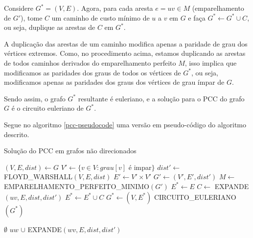 \documentclass[12pt, a4paper]{article}
\begin{document}
Considere $G^* = (V, E)$. Agora, para cada aresta $e = uv \in M$ (emparelhamento de $G'$), tome $C$ um caminho de custo mínimo de $u$ a $v$ em $G$ e faça $G^* \leftarrow G^* \cup C$, ou seja, duplique as arestas de $C$ em $G^*$.

A duplicação das arestas de um caminho modifica apenas a paridade de grau dos vértices extremos.
Como, no procedimento acima, estamos duplicando as arestas de todos caminhos derivados do emparelhamento perfeito $M$, isso implica que modificamos as paridades dos graus de todos os vértices de $G^*$, ou seja, modificamos apenas as paridades dos graus dos vértices de grau ímpar de $G$.

Sendo assim, o grafo $G^*$ resultante é euleriano, e a solução para o PCC do grafo $G$ é o circuito euleriano de $G^*$.


Segue no algoritmo \ref{pcc-pseudocode} uma versão em pseudo-código do algoritmo descrito.





    \begin{algorithm}
    \caption{Solução do PCC em grafos não direcionados}
    \label{pcc-pseudocode}
    \begin{algorithmic}[1]
    \State $(V, E, dist) \gets G$
    \State $V' \gets \{v \in V : grau[v] $ é impar$\}$
    \State $dist' \gets $ FLOYD\_WARSHALL$(V, E, dist)$
    \State $E' \gets V' \times V'$
    \State $G' \gets (V', E', dist')$
    \State $M \gets $ EMPARELHAMENTO\_PERFEITO\_MINIMO$(G')$
    \State $E^* \gets E$
        \State $C \gets$ EXPANDE$(uv, E, dist, dist')$
        \State $E^* \gets E^* \cup C$
    \EndFor
    \State $G^* \gets (V, E^*)$
    \State \Return CIRCUITO\_EULERIANO$(G^*)$
    \EndFunction 

    \Return $\emptyset$
    \EndIf
        \State \Return $uw$  $\cup$ EXPANDE$(wv, E, dist, dist')$
        \EndIf
    \EndFor
    \EndFunction

    \end{algorithmic}
    \end{algorithm}
\end{document}
